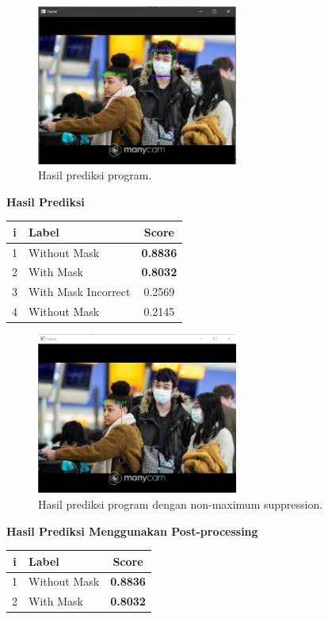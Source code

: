 \documentclass{article}
\begin{document}
	\begin{figure}[H]
		\centering
		\includegraphics[width=250px]{../demo/Results/implementation/raw_prediction_nms0_labeled.png}
		\caption{Hasil prediksi program.}
	\end{figure}
	{\large{\textbf{Hasil Prediksi}}}
	\begin{table}[H]
		\centering
		\begin{tabular}{clc}
		\hline
		\textbf{i} & \textbf{Label}               & \textbf{Score}  \\ \hline
		1 & Without Mask        & \textbf{0.8836} \\
		2 & With Mask           & \textbf{0.8032} \\
		3 & With Mask Incorrect & 0.2569 \\
		4 & Without Mask        & 0.2145
		\end{tabular}
	\end{table}
	\newpage
	
	\begin{figure}[H]
		\centering
		\includegraphics[width=250px]{../demo/Results/implementation/with_nms0.png}
		\caption{Hasil prediksi program dengan non-maximum suppression.}
  	\end{figure}
	{\large{\textbf{Hasil Prediksi Menggunakan Post-processing}}}
	\begin{table}[H]
		\centering
		\begin{tabular}{clc}
			\hline
			\textbf{i} & \textbf{Label}               & \textbf{Score}  \\ \hline
			1 & Without Mask        & \textbf{0.8836} \\
			2 & With Mask           & \textbf{0.8032} \\
		\end{tabular}
	\end{table}
  
\end{document}
